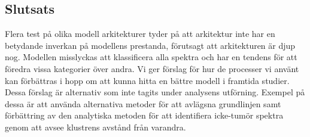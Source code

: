 \subsection*{Slutsats}

Flera test på olika modell arkitekturer tyder på att arkitektur inte har en betydande inverkan på modellens prestanda, förutsagt att arkitekturen är djup nog. Modellen misslyckas att klassificera alla spektra och har en tendens för att föredra vissa kategorier över andra. Vi ger förslag för hur de processer vi använt kan förbättras i hopp om att kunna hitta en bättre modell i framtida studier. Dessa förslag är alternativ som inte tagits under analysens utförning. Exempel på dessa är att använda alternativa metoder för att avlägsna grundlinjen samt förbättring av den analytiska metoden för att identifiera icke-tumör spektra genom att avsee klustrens avstånd från varandra.